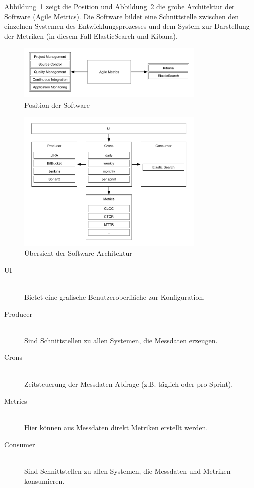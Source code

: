 Abbildung~\ref{fig:position_architecture} zeigt die Position und Abbildung~\ref{fig:overview_architecture} die grobe Architektur der Software (Agile Metrics).
Die Software bildet eine Schnittstelle zwischen den einzelnen Systemen des Entwicklungsprozesses und dem System zur Darstellung der Metriken (in diesem Fall ElasticSearch und Kibana).

\begin{savenotes}
    \begin{figure}[H] 
        \centering
            \includegraphics[width=0.8\textwidth]{img/position-overview.png}
        \caption{Position der Software}\label{fig:position_architecture}
    \end{figure}
\end{savenotes}

\begin{savenotes}
    \begin{figure}[H] 
        \centering
            \includegraphics[width=0.8\textwidth]{img/architecture-overview.png}
        \caption{Übersicht der Software-Architektur}\label{fig:overview_architecture}
    \end{figure}
\end{savenotes}

\begin{description}
    \item[UI] \hfill \\ Bietet eine grafische Benutzeroberfläche zur Konfiguration.
    \item[Producer] \hfill \\ Sind Schnittstellen zu allen Systemen, die Messdaten erzeugen.
    \item[Crons] \hfill \\ Zeitsteuerung der Messdaten-Abfrage (z.B. täglich oder pro Sprint).
    \item[Metrics] \hfill \\ Hier können aus Messdaten direkt Metriken erstellt werden.
    \item[Consumer] \hfill \\ Sind Schnittstellen zu allen Systemen, die Messdaten und Metriken konsumieren.
\end{description}
